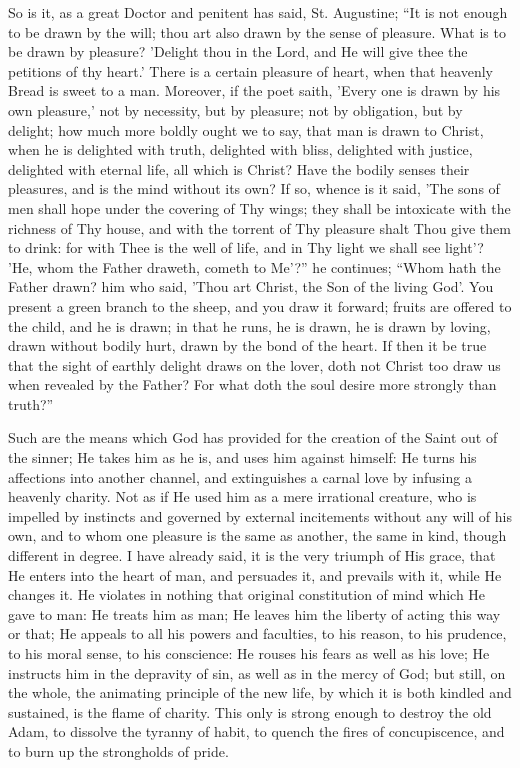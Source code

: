 So is it, as a great Doctor and penitent has said, St.
Augustine; ``It is not enough to be drawn by the will; thou art
also drawn by the sense of pleasure. What is to be drawn by pleasure?
'Delight thou in the Lord, and He will give thee the petitions of thy
heart.' There is a certain pleasure of heart, when that heavenly Bread
is sweet to a man. Moreover, if the poet saith, 'Every one is drawn by
his own pleasure,' not by necessity, but by pleasure; not by
obligation, but by delight; how much more boldly ought we to say, that
man is drawn to Christ, when he is delighted with truth, delighted
with bliss, delighted with justice, delighted with eternal life, all
which is Christ? Have the bodily senses their pleasures, and is the
mind without its own? If so, whence is it said, 'The sons of men shall
hope under the covering of Thy wings; they shall be intoxicate with
the richness of Thy house, and with the torrent of Thy pleasure shalt
Thou give them to drink: for with Thee is the well of life, and in Thy
light we shall see light'? 'He, whom the Father draweth, cometh to
Me'?'' he continues; ``Whom hath the Father drawn? him who said, 'Thou art
Christ, the Son of the living God'. You present a green branch to the
sheep, and you draw it forward; fruits are offered to the child, and
he is drawn; in that he runs, he is drawn, he is drawn by loving,
drawn without bodily hurt, drawn by the bond of the heart. If then it
be true that the sight of earthly delight draws on the lover, doth not
Christ too draw us when revealed by the Father? For what doth the soul
desire more strongly than truth?''

Such are the means which God has provided for the creation of the
Saint out of the sinner; He takes him as he is, and uses him against
himself: He turns his affections into another channel, and
extinguishes a carnal love by infusing a heavenly charity. Not as if
He used him as a mere irrational creature, who is impelled by
instincts and governed by external incitements without any will of his
own, and to whom one pleasure is the same as another, the same in
kind, though different in degree. I have already said, it is the very
triumph of His grace, that He enters into the heart of man, and
persuades it, and prevails with it, while He changes it. He violates
in nothing that original constitution of mind which He gave to man: He
treats him as man; He leaves him the liberty of acting this way or
that; He appeals to all his powers and faculties, to his reason, to
his prudence, to his moral sense, to his conscience: He rouses his
fears as well as his love; He instructs him in the depravity of sin,
as well as in the mercy of God; but still, on the whole, the animating
principle of the new life, by which it is both kindled and sustained,
is the flame of charity. This only is strong enough to destroy the old
Adam, to dissolve the tyranny of habit, to quench the fires of
concupiscence, and to burn up the strongholds of pride.

